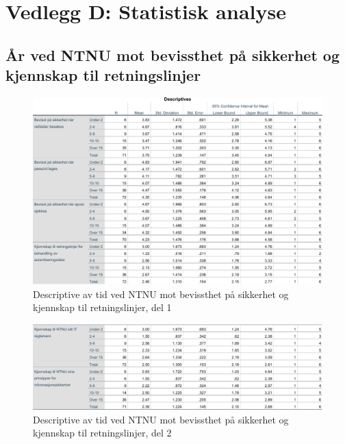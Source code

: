 \chapter*{Vedlegg D: Statistisk analyse}
\label{vedlegg:statanalys}

\section{År ved NTNU mot bevissthet på sikkerhet og kjennskap til retningslinjer}
\label{aarvedNTNU-mot-bevissthetogkjennskap}
\begin{figure}[H]
    \centering
    \includegraphics[scale=0.7]{case_2/bilder/spss/anova_ttest/ansiennitet_bevissthetogkjennskap_descriptive_1.pdf}
    \caption[ansiennitet-bevissthetogkjennskap-descriptive-1]{Descriptive av tid ved NTNU mot bevissthet på sikkerhet og kjennskap til retningslinjer, del 1}
    \label{fig:ansiennitet-bevissthetogkjennskap-descriptive-1}
\end{figure}

\begin{figure}[H]
    \centering
    \includegraphics[scale=0.7]{case_2/bilder/spss/anova_ttest/ansiennitet_bevissthetogkjennskap_descriptive_2.pdf}
    \caption[ansiennitet-bevissthetogkjennskap-descriptive-1]{Descriptive av tid ved NTNU mot bevissthet på sikkerhet og kjennskap til retningslinjer, del 2}
    \label{fig:ansiennitet-bevissthetogkjennskap-descriptive-2}
\end{figure}

